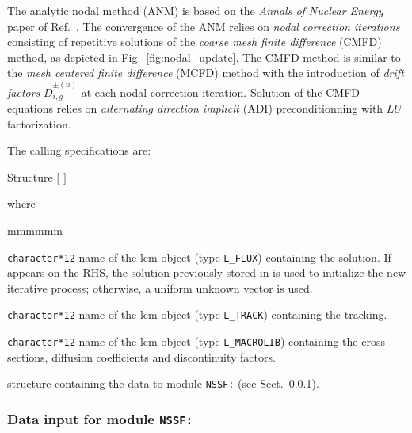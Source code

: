 The analytic nodal method (ANM) is based on the {\sl Annals of Nuclear Energy} paper of Ref.~. The convergence of the ANM
relies on {\sl nodal correction iterations} consisting of repetitive solutions of the {\sl coarse mesh finite difference} (CMFD) method, as depicted in Fig.~\ref{fig:nodal_update}.
The CMFD method is similar to the {\sl mesh centered finite difference} (MCFD) method with the introduction of {\sl drift factors} $\tilde D_{i,g}^{\pm(n)}$ at each nodal correction
iteration. Solution of the CMFD equations relies on {\sl alternating direction implicit} (ADI) preconditionning with $LU$ factorization.

\goodbreak

The calling specifications are:

\begin{DataStructure}{Structure }
 \moc{:=}  $[$  $]$   \moc{::} 
\end{DataStructure}

\noindent where
\begin{ListeDeDescription}{mmmmmm}

\item[\dusa{FLUX}] {\tt character*12} name of the {\sc lcm} object (type {\tt L\_FLUX}) containing the solution. If  appears on the RHS, the solution previously stored in 
is used to initialize the new iterative process; otherwise, a uniform unknown vector is used.

\item[\dusa{TRACK}] {\tt character*12} name of the {\sc lcm} object (type {\tt L\_TRACK}) containing the {\sc tracking}.

\item[\dusa{MACRO}] {\tt character*12} name of the {\sc lcm} object (type {\tt L\_MACROLIB}) containing the cross sections, diffusion coefficients and discontinuity
factors.

\item[\dstr{NSSF\_data}] structure containing the data to module {\tt NSSF:} (see Sect.~\ref{sect:nssf_data}).

\end{ListeDeDescription}

\vskip 0.2cm

\subsubsection{Data input for module {\tt NSSF:}}\label{sect:nssf_data}

